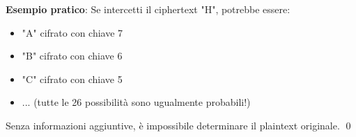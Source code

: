 \textbf{Esempio pratico}: Se intercetti il ciphertext "H", potrebbe essere:
\begin{itemize}
    \item "A" cifrato con chiave 7
    \item "B" cifrato con chiave 6  
    \item "C" cifrato con chiave 5
    \item ... (tutte le 26 possibilità sono ugualmente probabili!)
\end{itemize}

Senza informazioni aggiuntive, è impossibile determinare il plaintext originale. \qed

